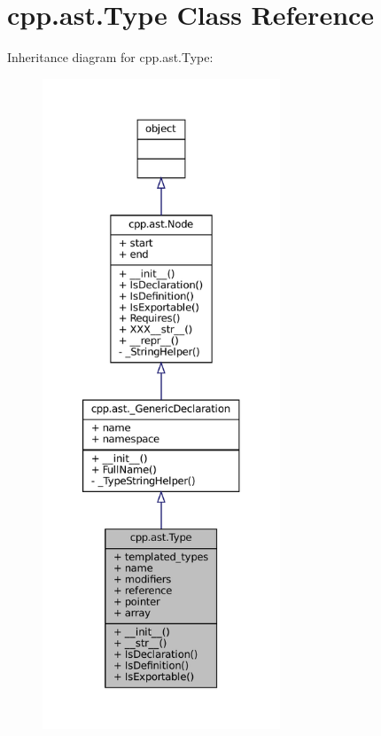 \hypertarget{classcpp_1_1ast_1_1Type}{}\section{cpp.\+ast.\+Type Class Reference}
\label{classcpp_1_1ast_1_1Type}


Inheritance diagram for cpp.\+ast.\+Type\+:
\nopagebreak
\begin{figure}[H]
\begin{center}
\leavevmode
\includegraphics[height=550pt]{classcpp_1_1ast_1_1Type__inherit__graph}
\end{center}
\end{figure}


